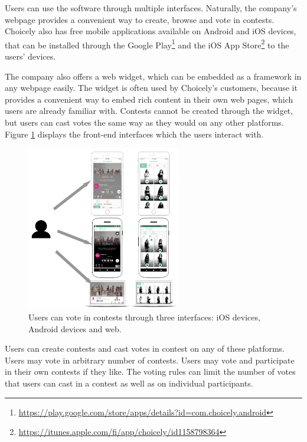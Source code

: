     Users can use the software through multiple interfaces. Naturally, the company's webpage provides a convenient way to create, browse and vote in contests. Choicely also has free mobile applications available on Android and iOS devices, that can be installed through the Google Play\footnote{\url{https://play.google.com/store/apps/details?id=com.choicely.android}} and the iOS App Store\footnote{\url{https://itunes.apple.com/fi/app/choicely/id1158798364}} to the users' devices. 

    The company also offers a web widget, which can be embedded as a framework in any webpage easily. The widget is often used by Choicely's customers, because it provides a convenient way to embed rich content in their own web pages, which users are already familiar with. Contests cannot be created through the widget, but users can cast votes the same way as they would on any other platforms. Figure \ref{choicely_platforms} displays the front-end interfaces which the users interact with.
    
    \begin{figure}[H]
        \begin{center}
            \includegraphics[width=0.6\textwidth]{images/choicely_platforms.png}
            \caption{Users can vote in contests through three interfaces: iOS devices, Android devices and web.}
            \label{choicely_platforms}
        \end{center}
    \end{figure} 

    Users can create contests and cast votes in contest on any of these platforms. Users may vote in arbitrary number of contests. Users may vote and participate in their own contests if they like. The voting rules can limit the number of votes that users can cast in a contest as well as on individual participants. 

